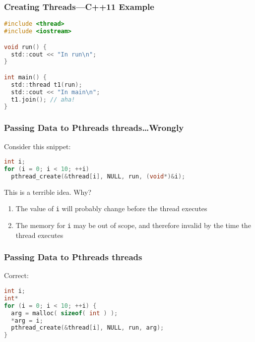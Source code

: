 \begin{frame}[fragile]
  \frametitle{Creating Threads---C++11 Example}


\begin{lstlisting}[language=C]
#include <thread>
#include <iostream>

void run() {
  std::cout << "In run\n";
}

int main() {
  std::thread t1(run);
  std::cout << "In main\n";
  t1.join(); // aha!
}
\end{lstlisting}

\end{frame}

\begin{frame}[fragile]
  \frametitle{Passing Data to Pthreads threads\ldots Wrongly}


Consider this snippet:
\vfill
\begin{lstlisting}[language=C]
int i;
for (i = 0; i < 10; ++i)
  pthread_create(&thread[i], NULL, run, (void*)&i);
\end{lstlisting}
  \vfill
  This is a \alert{terrible} idea. Why?
  \vfill
  \begin{enumerate}
    \item<2-> The value of {\tt i} will probably change before the thread executes
    \item<2-> The memory for {\tt i} may be out of scope, and therefore invalid by
          the time the thread executes
  \end{enumerate}


\end{frame}

\begin{frame}[fragile]
  \frametitle{Passing Data to Pthreads threads}
  
Correct:


\begin{lstlisting}[language=C]
int i;
int*
for (i = 0; i < 10; ++i) {
  arg = malloc( sizeof( int ) );
  *arg = i;
  pthread_create(&thread[i], NULL, run, arg);
}
\end{lstlisting}


\end{frame}



